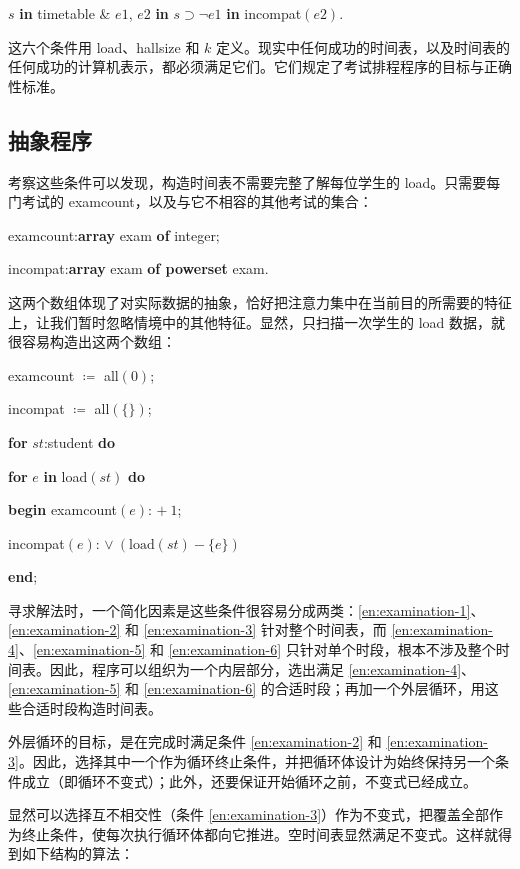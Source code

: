 \quad $s$ \textbf{in} timetable \& $e1$, $e2$ \textbf{in} $s \supset\neg e1$ \textbf{in} incompat$(e2)$.

这六个条件用 load、hallsize 和 $k$ 定义。现实中任何成功的时间表，以及时间表的任何成功的计算机表示，都必须满足它们。它们规定了考试排程程序的目标与正确性标准。

\subsection{抽象程序}

考察这些条件可以发现，构造时间表不需要完整了解每位学生的 load。只需要每门考试的 examcount，以及与它不相容的其他考试的集合：

\quad examcount:\textbf{array} exam \textbf{of} integer;

\quad incompat:\textbf{array} exam \textbf{of powerset} exam.

\noindent
这两个数组体现了对实际数据的抽象，恰好把注意力集中在当前目的所需要的特征上，让我们暂时忽略情境中的其他特征。显然，只扫描一次学生的 load 数据，就很容易构造出这两个数组：

\quad examcount $\coloneq$ all$(0)$;

\quad incompat $\coloneq$ all$(\{\})$;

\quad \textbf{for} $st$:student \textbf{do}

\quad \quad \textbf{for} $e$ \textbf{in} load$(st)$ \textbf{do}

\quad \quad \quad \textbf{begin} examcount$(e)$: $+\ 1$;

\quad \quad \quad \quad incompat$(e)$: $\vee\ (\text{load}(st) - \{e\})$

\quad \quad \quad \textbf{end};

寻求解法时，一个简化因素是这些条件很容易分成两类：\ref{en:examination-1}、\ref{en:examination-2} 和 \ref{en:examination-3} 针对整个时间表，而 \ref{en:examination-4}、\ref{en:examination-5} 和 \ref{en:examination-6} 只针对单个时段，根本不涉及整个时间表。因此，程序可以组织为一个内层部分，选出满足 \ref{en:examination-4}、\ref{en:examination-5} 和 \ref{en:examination-6} 的合适时段；再加一个外层循环，用这些合适时段构造时间表。

外层循环的目标，是在完成时满足条件 \ref{en:examination-2} 和 \ref{en:examination-3}。因此，选择其中一个作为循环终止条件，并把循环体设计为始终保持另一个条件成立（即循环不变式）；此外，还要保证开始循环之前，不变式已经成立。

显然可以选择互不相交性（条件 \ref{en:examination-3}）作为不变式，把覆盖全部作为终止条件，使每次执行循环体都向它推进。空时间表显然满足不变式。这样就得到如下结构的算法：

